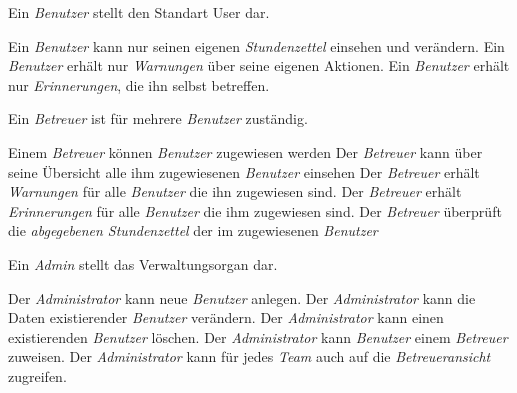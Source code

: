 \begin{requirements}
    Ein \emph{Benutzer} stellt den Standart User dar.
    \begin{requirements}
         Ein \emph{Benutzer} kann nur seinen eigenen \emph{Stundenzettel} einsehen und verändern.
         Ein \emph{Benutzer} erhält nur \emph{Warnungen} über seine eigenen Aktionen.
         Ein \emph{Benutzer} erhält nur \emph{Erinnerungen}, die ihn selbst betreffen.
    \end{requirements}

        Ein \emph{Betreuer} ist für mehrere \emph{Benutzer} zuständig.
        \begin{requirements}
             Einem \emph{Betreuer} können \emph{Benutzer} zugewiesen werden
             Der \emph{Betreuer} kann über seine Übersicht alle ihm zugewiesenen \emph{Benutzer} einsehen
             Der \emph{Betreuer} erhält \emph{Warnungen} für alle \emph{Benutzer} die ihn zugewiesen sind.
             Der \emph{Betreuer} erhält \emph{Erinnerungen} für alle \emph{Benutzer} die ihm zugewiesen sind.
             Der \emph{Betreuer} überprüft die \emph{abgegebenen Stundenzettel} der im zugewiesenen \emph{Benutzer}
        \end{requirements}

        Ein \emph{Admin} stellt das Verwaltungsorgan dar.
        \begin{requirements}
             Der \emph{Administrator} kann neue \emph{Benutzer} anlegen.
             Der \emph{Administrator} kann die Daten existierender \emph{Benutzer} verändern.
             Der \emph{Administrator} kann einen existierenden \emph{Benutzer} löschen.
             Der \emph{Administrator} kann \emph{Benutzer} einem \emph{Betreuer} zuweisen.
             Der \emph{Administrator} kann für jedes \emph{Team} auch auf die \emph{Betreueransicht} zugreifen.
        \end{requirements}
\end{requirements}

